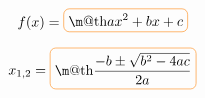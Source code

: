 \documentclass[10pt]{article}
\makeatletter
\newcommand*{\boxcolor}{orange}
\renewcommand{\boxed}[1]{\textcolor{\boxcolor}{%
\tikz[baseline={([yshift=-1ex]current bounding box.center)}] \node [rectangle, minimum width=1ex,rounded corners,draw] {\normalcolor\m@th$\displaystyle#1$};}}
\makeatother
\begin{document}
\begin{equation}
f(x)=\boxed{ax^2+bx+c}
\end{equation}

\begin{equation}
x_{1,2}=\boxed{\frac{-b\pm \sqrt{b^2-4ac}}{2a}}
\end{equation}
\end{document}
